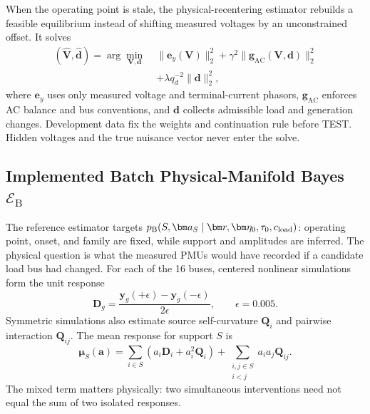 When the operating point is stale, the physical-recentering estimator rebuilds a feasible equilibrium instead of shifting measured voltages by an unconstrained offset. It solves
\begin{equation}
 \begin{aligned}
 (\widehat{\bm V},\widehat{\bm d})
 =\arg\min_{\bm V,\bm d}\; &\|\bm e_y(\bm V)\|_2^2
 +\gamma^2\|\bm g_{\mathrm{AC}}(\bm V,\bm d)\|_2^2\\[-1mm]
 &+\lambda q_d^{-2}\|\bm d\|_2^2,
 \end{aligned}
 \label{eq:e06h-map}
\end{equation}
where $\bm e_y$ uses only measured voltage and terminal-current phasors, $\bm g_{\mathrm{AC}}$ enforces AC balance and bus conventions, and $\bm d$ collects admissible load and generation changes. Development data fix the weights and continuation rule before TEST. Hidden voltages and the true nuisance vector never enter the solve.

\subsection{Implemented Batch Physical-Manifold Bayes $\mathcal E_{\mathrm B}$}
\label{sec:load-event-inference}

The reference estimator targets
$p_{\mathrm B}(S,\bm a_S\mid\bm r,\bm\eta_0,\tau_0,c_{\rm load})$:
operating point, onset, and family are fixed, while support and amplitudes are
inferred. The physical question is what the measured PMUs would have recorded
if a candidate load bus had changed. For each of the 16 buses, centered nonlinear simulations form the unit response
\begin{equation}
 \bm D_g=\frac{\bm y_g(+\epsilon)-\bm y_g(-\epsilon)}{2\epsilon},
 \qquad \epsilon=0.005.
 \label{eq:load-tangent}
\end{equation}
Symmetric simulations also estimate source self-curvature $\bm Q_i$ and pairwise interaction $\bm Q_{ij}$. The mean response for support $S$ is
\begin{equation}
 \bm\mu_S(\bm a)=\sum_{i\in S}(a_i\bm D_i+a_i^2\bm Q_i)
 +\sum_{\substack{i,j\in S\\i<j}}a_ia_j\bm Q_{ij}.
 \label{eq:load-multi-source-mean}
\end{equation}
The mixed term matters physically: two simultaneous interventions need not equal the sum of two isolated responses.

